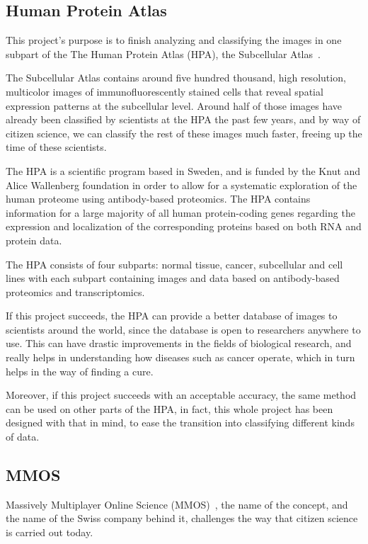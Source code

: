 \subsection{Human Protein Atlas}

This project's purpose is to finish analyzing and classifying the images in one subpart of the The Human Protein Atlas (HPA), the Subcellular Atlas~\cite{subcellatlas}.

The Subcellular Atlas contains around five hundred thousand, high resolution, multicolor images of immunofluorescently stained cells that reveal spatial expression patterns at the subcellular level. Around half of those images have already been classified by scientists at the HPA the past few years, and by way of citizen science, we can classify the rest of these images much faster, freeing up the time of these scientists.

The HPA is a scientific program based in Sweden, and is funded by the Knut and Alice Wallenberg foundation in order to allow for a systematic exploration of the human proteome using antibody-based proteomics. The HPA contains information for a large majority of all human protein-coding genes regarding the expression and localization of the corresponding proteins based on both RNA and protein data.

The HPA consists of four subparts: normal tissue, cancer, subcellular and cell lines with each subpart containing images and data based on antibody-based proteomics and transcriptomics.

If this project succeeds, the HPA can provide a better database of images to scientists around the world, since the database is open to researchers anywhere to use. This can have drastic improvements in the fields of biological research, and really helps in understanding how diseases such as cancer operate, which in turn helps in the way of finding a cure. 

Moreover, if this project succeeds with an acceptable accuracy, the same method can be used on other parts of the HPA, in fact, this whole project has been designed with that in mind, to ease the transition into classifying different kinds of data.

\subsection{MMOS}

Massively Multiplayer Online Science (MMOS)~\cite{mmos}, the name of the concept, and the name of the Swiss company behind it, challenges the way that citizen science is carried out today. 

